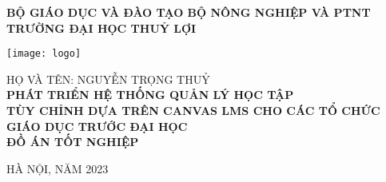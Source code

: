\documentclass[main-report.tex]{subfiles}
\begin{document}
\begin{titlepage}
\thispagestyle{empty}
\thisfancypage{
\setlength{\fboxsep}{3pt}
\fbox}{} 
\begin{center}
{\bf\large BỘ GIÁO DỤC VÀ ĐÀO TẠO \hspace{1.5cm} BỘ NÔNG NGHIỆP VÀ PTNT}\\
{\bf\subtitlesize TRƯỜNG ĐẠI HỌC THUỶ LỢI}\\[4cm]

{
\vspace*{-6\baselineskip}
\hspace*{0\textwidth}\texttt{[image: logo]}
\par\vspace*{4\baselineskip}
}
{\large HỌ VÀ TÊN: NGUYỄN TRỌNG THUỶ}\\
\vspace{4\baselineskip}
{\bf\Large PHÁT TRIỂN HỆ THỐNG QUẢN LÝ HỌC TẬP}\\
{\bf\Large TÙY CHỈNH DỰA TRÊN CANVAS LMS CHO CÁC TỔ CHỨC GIÁO DỤC TRƯỚC ĐẠI HỌC}\\[4cm]
{\bf ĐỒ ÁN TỐT NGHIỆP}\\
\end{center}
\vspace{6cm}
\begin{center}
{\large HÀ NỘI, NĂM 2023}
\end{center}
\end{titlepage}
\end{document}
